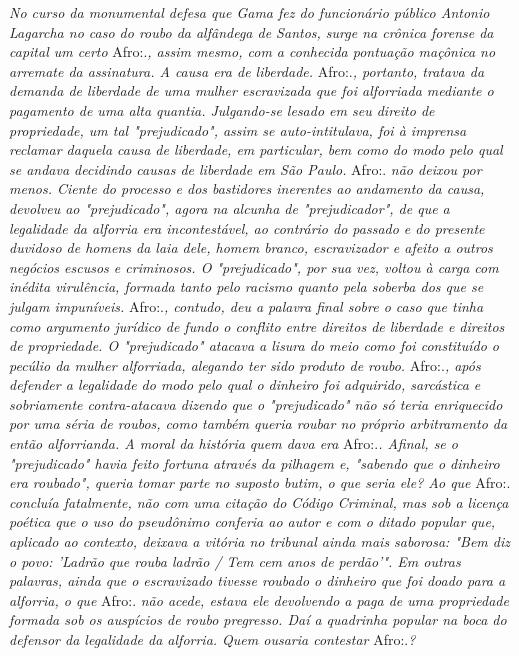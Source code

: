 \emph{No curso da monumental defesa que Gama fez do funcionário público
Antonio Lagarcha no caso do roubo da alfândega de Santos, surge na
crônica forense da capital um certo} Afro:.\emph{, assim mesmo, com a
conhecida pontuação maçônica no arremate da assinatura. A causa era de
liberdade.} Afro:.\emph{, portanto, tratava da demanda de liberdade de
uma mulher escravizada que foi alforriada mediante o pagamento de uma
alta quantia. Julgando-se lesado em seu direito de propriedade, um tal
"prejudicado", assim se auto-intitulava, foi à imprensa reclamar daquela
causa de liberdade, em particular, bem como do modo pelo qual se andava
decidindo causas de liberdade em São Paulo.} Afro:. \emph{não deixou por
menos. Ciente do processo e dos bastidores inerentes ao andamento da
causa, devolveu ao "prejudicado", agora na alcunha de "prejudicador", de
que a legalidade da alforria era incontestável, ao contrário do passado
e do presente duvidoso de homens da laia dele, homem branco,
escravizador e afeito a outros negócios escusos e criminosos. O
"prejudicado", por sua vez, voltou à carga com inédita virulência,
formada tanto pelo racismo quanto pela soberba dos que se julgam
impuníveis.} Afro:.\emph{, contudo, deu a palavra final sobre o caso que
tinha como argumento jurídico de fundo o conflito entre direitos de
liberdade e direitos de propriedade. O "prejudicado" atacava a lisura do
meio como foi constituído o pecúlio da mulher alforriada, alegando ter
sido produto de roubo.} Afro:.\emph{, após defender a legalidade do modo
pelo qual o dinheiro foi adquirido, sarcástica e sobriamente
contra-atacava dizendo que o "prejudicado" não só teria enriquecido por
uma séria de roubos, como também queria roubar no próprio arbitramento
da então alforrianda. A moral da história quem dava era} Afro:.\emph{.
Afinal, se o "prejudicado" havia feito fortuna através da pilhagem e,
"sabendo que o dinheiro era roubado", queria tomar parte no suposto
butim, o que seria ele? Ao que} Afro:. \emph{concluía fatalmente, não
com uma citação do Código Criminal, mas sob a licença poética que o uso
do pseudônimo conferia ao autor e com o ditado popular que, aplicado ao
contexto, deixava a vitória no tribunal ainda mais saborosa: "Bem diz o
povo: 'Ladrão que rouba ladrão / Tem cem anos de perdão'". Em outras
palavras, ainda que o escravizado tivesse roubado o dinheiro que foi
doado para a alforria, o que} Afro:. \emph{não acede, estava ele
devolvendo a paga de uma propriedade formada sob os auspícios de roubo
pregresso. Daí a quadrinha popular na boca do defensor da legalidade da
alforria. Quem ousaria contestar} Afro:.\emph{?}

